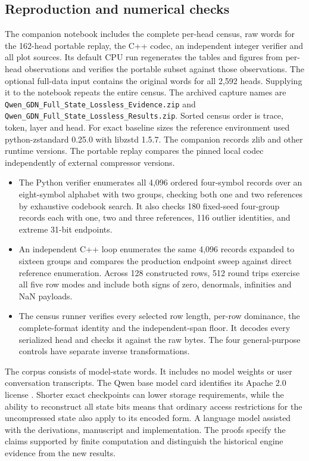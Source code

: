 \subsection{Reproduction and numerical checks}
The companion notebook includes the complete per-head census, raw words for the 162-head portable replay, the C++ codec, an independent integer verifier and all plot sources. Its default CPU run regenerates the tables and figures from per-head observations and verifies the portable subset against those observations. The optional full-data input contains the original words for all 2,592 heads. Supplying it to the notebook repeats the entire census. The archived capture names are \texttt{Qwen\_GDN\_Full\_State\_Lossless\_Evidence.zip} and \texttt{Qwen\_GDN\_Full\_State\_Lossless\_Results.zip}. Sorted census order is trace, token, layer and head. For exact baseline sizes the reference environment used python-zstandard 0.25.0 with libzstd 1.5.7. The companion records zlib and other runtime versions. The portable replay compares the pinned local codec independently of external compressor versions.

\begin{itemize}\setlength\itemsep{1pt}
\item The Python verifier enumerates all 4,096 ordered four-symbol records over an eight-symbol alphabet with two groups, checking both one and two references by exhaustive codebook search. It also checks 180 fixed-seed four-group records each with one, two and three references, 116 outlier identities, and extreme 31-bit endpoints.
\item An independent C++ loop enumerates the same 4,096 records expanded to sixteen groups and compares the production endpoint sweep against direct reference enumeration. Across 128 constructed rows, 512 round trips exercise all five row modes and include both signs of zero, denormals, infinities and NaN payloads.
\item The census runner verifies every selected row length, per-row dominance, the complete-format identity and the independent-span floor. It decodes every serialized head and checks it against the raw bytes. The four general-purpose controls have separate inverse transformations.
\end{itemize}

The corpus consists of model-state words. It includes no model weights or user conversation transcripts. The Qwen base model card identifies its Apache 2.0 license \cite{qwen}. Shorter exact checkpoints can lower storage requirements, while the ability to reconstruct all state bits means that ordinary access restrictions for the uncompressed state also apply to its encoded form. A language model assisted with the derivations, manuscript and implementation. The proofs specify the claims supported by finite computation and distinguish the historical engine evidence from the new results.
